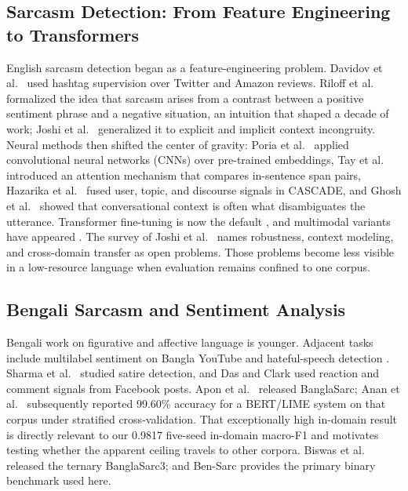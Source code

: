 \documentclass{ieeeaccess}
\newcommand{\dset}[1]{#1}
\begin{document}
\subsection{Sarcasm Detection: From Feature Engineering to Transformers}
\label{sec:rw-sarcasm}

English sarcasm detection began as a feature-engineering problem. Davidov et al.\ \cite{davidov2010semisupervised} used hashtag supervision over Twitter and Amazon reviews. Riloff et al.\ \cite{riloff2013sarcasm} formalized the idea that sarcasm arises from a contrast between a positive sentiment phrase and a negative situation, an intuition that shaped a decade of work; Joshi et al.\ \cite{joshi2015harnessing} generalized it to explicit and implicit context incongruity. Neural methods then shifted the center of gravity: Poria et al.\ \cite{poria2016deeper} applied convolutional neural networks (CNNs) over pre-trained embeddings, Tay et al.\ \cite{tay2018reasoning} introduced an attention mechanism that compares in-sentence span pairs, Hazarika et al.\ \cite{hazarika2018cascade} fused user, topic, and discourse signals in CASCADE, and Ghosh et al.\ \cite{ghosh2018sarcasm} showed that conversational context is often what disambiguates the utterance. Transformer fine-tuning is now the default \cite{babanejad2020affective}, and multimodal variants have appeared \cite{cai2019multimodal}. The survey of Joshi et al.\ \cite{joshi2017automatic} names robustness, context modeling, and cross-domain transfer as open problems. Those problems become less visible in a low-resource language when evaluation remains confined to one corpus.

\subsection{Bengali Sarcasm and Sentiment Analysis}
\label{sec:rw-bengali}

Bengali work on figurative and affective language is younger. Adjacent tasks include multilabel sentiment on Bangla YouTube \cite{tripto2018detecting} and hateful-speech detection \cite{ishmam2019hateful,romim2021hate}. Sharma et al.\ \cite{sharma2019satire} studied satire detection, and Das and Clark \cite{das2018sarcasm} used reaction and comment signals from Facebook posts. Apon et al.\ \cite{apon2022banglasarc} released \dset{BanglaSarc}; Anan et al.\ \cite{anan2023interpretable} subsequently reported 99.60\% accuracy for a BERT/LIME system on that corpus under stratified cross-validation. That exceptionally high in-domain result is directly relevant to our 0.9817 five-seed in-domain macro-F1 and motivates testing whether the apparent ceiling travels to other corpora. Biswas et al.\ \cite{biswas2025banglasarc3} released the ternary \dset{BanglaSarc3}; and \dset{Ben-Sarc} \cite{lora2025bensarc} provides the primary binary benchmark used here.
\end{document}
